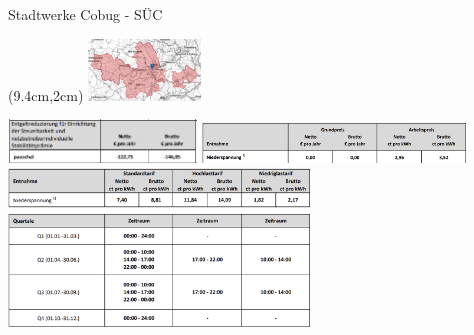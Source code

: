 \begin{frame}{Stadtwerke Cobug - SÜC}
   \begin{textblock*}{3.3cm}(9.4cm,2cm)
      \includegraphics[width=3cm]{images/Karte_Suec.png}
   \end{textblock*}
   \includegraphics[width=5cm]{images/SUeC-Modul1.png}
   \includegraphics[width=7cm]{images/SUeC-Modul2.png}
   \includegraphics[width=8cm]{images/SUeC-Modul3.png}
\end{frame}